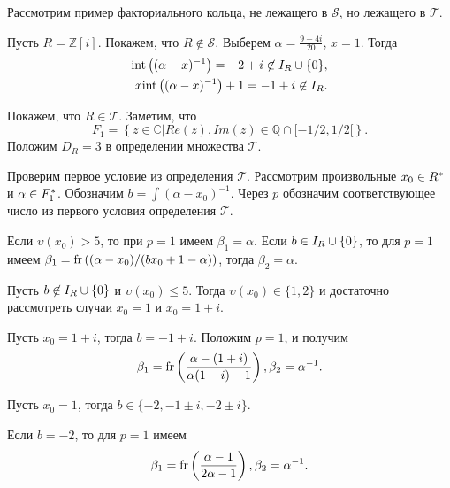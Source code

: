 \documentclass[_00_dissertation.tex]{subfiles}
\begin{document}
Рассмотрим пример факториального кольца, не лежащего в $\mathcal{S}$, но лежащего в $\mathcal{T}$.

\begin{example}\label{example:Z[i]}
    Пусть $R = \mathbb{Z}[i]$.
    Покажем, что $R \not\in \mathcal{S}$.
    Выберем $\alpha = \frac{9 - 4i}{20}$, $x = 1$.
    Тогда
    \begin{equation*}
        \begin{split}
            \textrm{int}\left((\alpha-x)^{-1}\right) = -2+i \not\in I_{R} \cup \{0\},\\
            x \textrm{int}\left((\alpha-x)^{-1}\right) + 1 = -1 + i \not\in I_{R}.
        \end{split}
    \end{equation*}

    Покажем, что $R \in \mathcal{T}$.
    Заметим, что
    \begin{equation*}
        F_1 = \left\{
            z \in \mathbb{C} | Re(z), Im(z) \in \mathbb{Q} \cap [-1/2,1/2[
        \right\}.
    \end{equation*}
    Положим $D_R = 3$ в определении множества $\mathcal{T}$.

    Проверим первое условие из определения $\mathcal{T}$.
    Рассмотрим произвольные $x_0 \in R^{*}$ и $\alpha \in F_1^{*}$.
    Обозначим $b = \int{(\alpha - x_0)^{-1}}$.
    Через $p$ обозначим соответствующее число из первого условия определения $\mathcal{T}$.
    
    Если $\upsilon(x_0) > 5$, то при $p = 1$ имеем $\beta_1 = \alpha$.
    Если $b \in I_{R} \cup \{0\}$, то для $p = 1$ имеем $\beta_1 = \textrm{fr}\left((\alpha - x_0)/(b x_0 + 1 - \alpha)\right)$, тогда $\beta_2 = \alpha$.

    Пусть $b \not\in I_{R} \cup \{0\}$ и $\upsilon(x_0) \le 5$.
    Тогда $\upsilon(x_0) \in \{1, 2\}$ и достаточно рассмотреть случаи $x_0 = 1$ и $x_0=1+i$.

    Пусть $x_0 = 1 + i$, тогда $b = -1 + i$.
    Положим $p = 1$, и получим
    \begin{equation*}
        \beta_1 = \textrm{fr}\left(\frac{\alpha - (1 + i)}{\alpha(1-i)-1}\right), \beta_2 = \alpha^{-1}.
    \end{equation*}

    Пусть $x_0 = 1$, тогда $b \in \{-2, -1 \pm i, -2 \pm i\}$.

    Если $b = -2$, то для $p = 1$ имеем
    \begin{equation*}
        \beta_1 = \textrm{fr}\left(\frac{\alpha - 1}{2\alpha - 1}\right), \beta_2 = \alpha^{-1}.
    \end{equation*}


\end{example}
\end{document}
